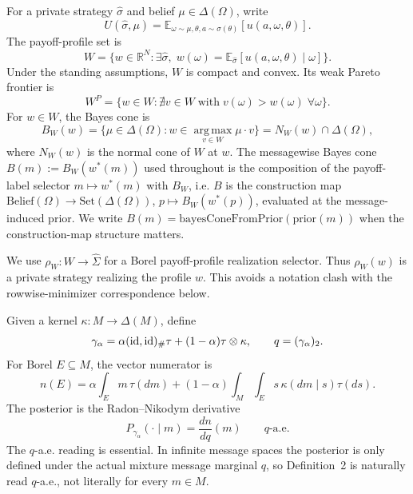 \documentclass[11pt]{article}
\theoremstyle{definition}
\theoremstyle{remark}
\newcommand{\R}{\mathbb{R}}
\newcommand{\Om}{\Omega}
\newcommand{\Si}{\Sigma}
\newcommand{\argmax}{\operatorname*{arg\,max}}
\newcommand{\E}{\mathbb{E}}
\begin{document}
For a private strategy $\hat\sigma$ and belief $\mu\in\Delta(\Om)$, write
\begin{equation}\label{eq:privatepayoff}
  U(\hat\sigma,\mu)
  = \E_{\omega\sim\mu,\theta,a\sim\hat\sigma(\theta)}[u(a,\omega,\theta)].
\end{equation}
The payoff-profile set is
\begin{equation}\label{eq:W}
  W
  = \big\{w\in\R^N:
      \exists\hat\sigma,\; w(\omega)=\E_{\hat\sigma}[u(a,\omega,\theta)\mid\omega]
    \big\}.
\end{equation}
Under the standing assumptions, $W$ is compact and convex. Its weak Pareto frontier is
\[
  W^P=\{w\in W: \nexists v\in W\;\text{with}\;v(\omega)>w(\omega)\;\forall\omega\}.
\]
For $w\in W$, the Bayes cone is
\begin{equation}\label{eq:bayescone}
  B_W(w)
  = \{\mu\in\Delta(\Om): w\in\argmax_{v\in W}\mu\cdot v\}
  = N_W(w)\cap\Delta(\Om),
\end{equation}
where $N_W(w)$ is the normal cone of $W$ at $w$. The messagewise Bayes cone $B(m):=B_W(w^*(m))$ used throughout is the composition of the payoff-label selector $m\mapsto w^*(m)$ with $B_W$, i.e. $B$ is the construction map $\mathrm{Belief}(\Om)\to\mathrm{Set}(\Delta(\Om))$, $p\mapsto B_W(w^*(p))$, evaluated at the message-induced prior. We write $B(m)=\mathrm{bayesConeFromPrior}(\mathrm{prior}(m))$ when the construction-map structure matters.

We use $\rho_W:W\to\hat\Si$ for a Borel payoff-profile realization selector. Thus $\rho_W(w)$ is a private strategy realizing the profile $w$. This avoids a notation clash with the rowwise-minimizer correspondence below.

Given a kernel $\kappa:M\to\Delta(M)$, define
\begin{equation}\label{eq:gammaq}
  \gamma_\alpha
  = \alpha({\rm id},{\rm id})_\#\tau +(1-\alpha)\tau\otimes\kappa,
  \qquad
  q=(\gamma_\alpha)_2.
\end{equation}
For Borel $E\subseteq M$, the vector numerator is
\begin{equation}\label{eq:vectornum}
  n(E)
  = \alpha\int_E m\,\tau(dm)
    +(1-\alpha)\int_M\int_E s\,\kappa(dm\mid s)\tau(ds).
\end{equation}
The posterior is the Radon--Nikodym derivative
\begin{equation}\label{eq:posteriorRN}
  P_{\gamma_\alpha}(\cdot\mid m)=\frac{dn}{dq}(m)
  \qquad q\text{-a.e.}
\end{equation}
The $q$-a.e. reading is essential. In infinite message spaces the posterior is only defined under the actual mixture message marginal $q$, so Definition~2 is naturally read $q$-a.e., not literally for every $m\in M$.
\end{document}
